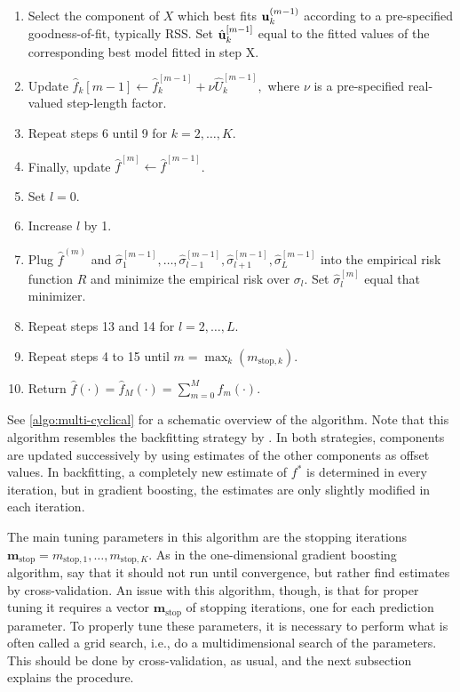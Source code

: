 \begin{algorithm}
\begin{enumerate}
    \item Select the component of $X$ which best fits $\mathbf{u}^{(m-1)}_k$ according to a pre-specified goodness-of-fit, typically RSS.
        Set $\hat{\mathbf{u}}^{[m-1]}_k$ equal to the fitted values of the corresponding best model fitted in step X.
    \item Update $\hat{f}_k{[m-1]}\gets\hat{f}_k^{[m-1]}+\nu\hat{U}_k^{[m-1]},$ where $\nu$ is a pre-specified real-valued step-length factor.
    \item Repeat steps 6 until 9 for $k=2,\ldots,K$. 
    \item Finally, update $\hat{f}^{[m]}\gets\hat{f}^{[m-1]}$.
    \item Set $l=0$.
    \item Increase $l$ by 1.
    \item Plug $\hat{f}^{(m)}$ and $\hat{\sigma}_1^{[m-1]},\ldots,\hat{\sigma}_{l-1}^{[m-1]},\hat{\sigma}_{l+1}^{[m-1]},\hat{\sigma}_{L}^{[m-1]}$ into the empirical risk function $R$ and minimize the empirical risk over $\sigma_l$. Set $\hat{\sigma}_l^{[m]}$ equal that minimizer.
    \item Repeat steps 13 and 14 for $l=2,\ldots,L$.
    \item Repeat steps 4 to 15 until $m=\max_k(m_{\text{stop},k})$.
    \item Return $\hat{f}(\cdot)=\hat{f}_M(\cdot)=\sum_{m=0}^Mf_m(\cdot)$.
\end{enumerate}
\end{algorithm}

See \eqref{algo:multi-cyclical} for a schematic overview of the algorithm. Note that this algorithm resembles the backfitting strategy by \citet{hastie1986}. In both strategies, components are updated successively by using estimates of the other components as offset values. In backfitting, a completely new estimate of $f^*$ is determined in every iteration, but in gradient boosting, the estimates are only slightly modified in each iteration.

The main tuning parameters in this algorithm are the stopping iterations $\mathbf{m}_{\text{stop}}=m_{\text{stop},1},\ldots,m_{\text{stop},K}$. As in the one-dimensional gradient boosting algorithm, \citet{schmid} say that it should not run until convergence, but rather find estimates by cross-validation. An issue with this algorithm, though, is that for proper tuning it requires a vector $\mathbf{m}_{\text{stop}}$ of stopping iterations, one for each prediction parameter. To properly tune these parameters, it is necessary to perform what is often called a grid search, i.e., do a multidimensional search of the parameters. This should be done by cross-validation, as usual, and the next subsection explains the procedure.

